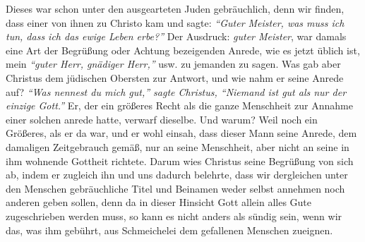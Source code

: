 Dieses war schon unter den ausgearteten Juden
gebräuchlich, denn wir finden, dass
einer von ihnen zu Christo kam und sagte:
\textit{"`Guter Meister, was muss ich tun,
dass ich das ewige Leben erbe?"'}
Der Ausdruck: \textit{guter
Meister}, war damals eine Art der Begrüßung oder Achtung bezeigenden Anrede, wie
es jetzt üblich ist, mein \textit{"`guter Herr, gnädiger Herr,"'} usw. zu
jemanden zu
sagen. Was gab aber Christus dem jüdischen Obersten zur Antwort, und wie nahm er
seine Anrede auf?
\textit{"`Was nennest du mich gut,"' sagte Christus, "`Niemand ist gut
als nur der einzige Gott."'} Er, der ein größeres Recht
als
die ganze Menschheit zur Annahme einer solchen anrede hatte, verwarf dieselbe.
Und warum? Weil noch ein Größeres, als er da war, und er wohl einsah, dass
dieser Mann seine Anrede, dem damaligen Zeitgebrauch gemäß, nur an seine
Menschheit, aber nicht an seine in ihm wohnende Gottheit richtete.
Darum wies
Christus seine Begrüßung von sich ab, indem er zugleich ihn und uns dadurch
belehrte, dass wir dergleichen unter den Menschen gebräuchliche Titel und
Beinamen weder selbst annehmen noch anderen geben sollen, denn da in dieser
Hinsicht Gott allein alles Gute zugeschrieben werden muss, so kann es nicht
anders als sündig sein, wenn wir das, was ihm gebührt, aus Schmeichelei dem
gefallenen Menschen zueignen.

\medskip

